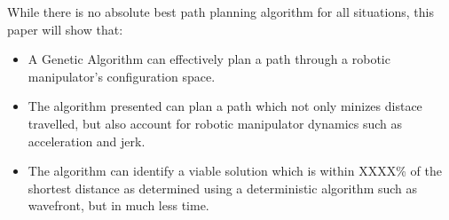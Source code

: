 While there is no absolute best path planning algorithm for all situations, this paper will show that:
\begin{itemize}
	\item A Genetic Algorithm can effectively plan a path through a robotic manipulator's configuration space.
	\item The algorithm presented can plan a path which not only minizes distace travelled, but also account for robotic manipulator dynamics such as acceleration and jerk.
	\item The algorithm can identify a viable solution which is within XXXX\% of the shortest distance as determined using a deterministic algorithm such as wavefront, but in much less time.
\end{itemize}

